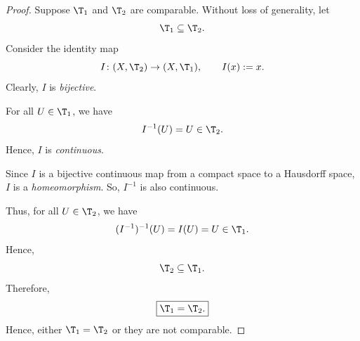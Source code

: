 
\begin{proof}
Suppose $\T_1$ and $\T_2$ are comparable. Without loss of generality, let
\[ \T_1\subseteq\T_2. \]
Consider the identity map
\[ I\colon(X,\T_2)\to(X,\T_1),\qquad I(x):=x. \]
Clearly, $I$ is \emph{bijective}.

For all $U\in\T_1$, we have
\[ I^{-1}(U)=U\in\T_2. \]
Hence, $I$ is \emph{continuous}.

Since $I$ is a bijective continuous map from a compact space to a Hausdorff space, $I$ is a
\emph{homeomorphism}. So, $I^{-1}$ is also continuous.

Thus, for all $U\in\T_2$, we have
\[ (I^{-1})^{-1}(U)=I(U)=U\in\T_1. \]
Hence,
\[ \T_2\subseteq\T_1. \]
Therefore,
\[ \boxed{\T_1=\T_2.} \]
Hence, either $\T_1=\T_2$ or they are not comparable.
\end{proof}
